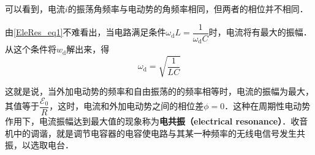 可以看到，电流$i$的振荡角频率与电动势的角频率相同，但两者的相位并不相同．

由\autoref{EleRes_eq1}不难看出，当电路满足条件$\omega_{\mathrm{d}} L=\dfrac{1}{\omega_{\mathrm{d}} C}$时，电流将有最大的振幅．从这个条件将$w_\mathrm{d}$解出来，得
\begin{equation}
\omega_{\mathrm{d}}=\sqrt{\frac{1}{L C}}
\end{equation}

这就是说，当外加电动势的频率和自由振荡的的频率相等时，电流的振幅为最大，其值等于$\dfrac{\mathscr{E}_{0}}{R}$，这时，电流和外加电动势之间的相位差$\phi=0$．这种在周期性电动势作用下，电流振幅达到最大值的现象称为\textbf{电共振（electrical resonance）}．收音机中的调谐，就是调节电容器的电容使电路与其某一种频率的无线电信号发生共振，以选取电台．
